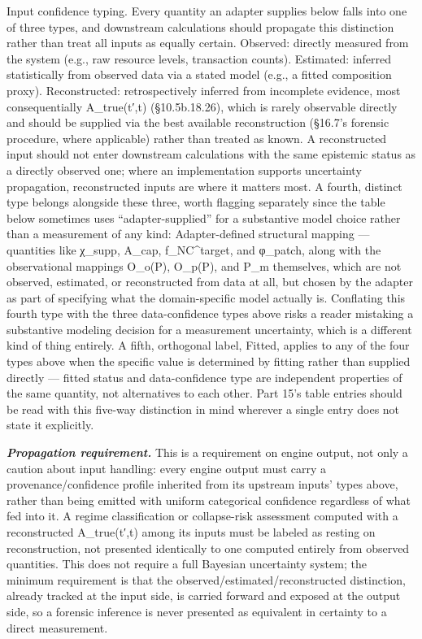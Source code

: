 \documentclass[
]{article}
\begin{document}
Input confidence typing. Every quantity an adapter supplies below falls
into one of three types, and downstream calculations should propagate
this distinction rather than treat all inputs as equally certain.
Observed: directly measured from the system (e.g., raw resource levels,
transaction counts). Estimated: inferred statistically from observed
data via a stated model (e.g., a fitted composition proxy).
Reconstructed: retrospectively inferred from incomplete evidence, most
consequentially A\_true(t′,t) (§10.5b.18.26), which is rarely observable
directly and should be supplied via the best available reconstruction
(§16.7's forensic procedure, where applicable) rather than treated as
known. A reconstructed input should not enter downstream calculations
with the same epistemic status as a directly observed one; where an
implementation supports uncertainty propagation, reconstructed inputs
are where it matters most. A fourth, distinct type belongs alongside
these three, worth flagging separately since the table below sometimes
uses ``adapter-supplied'' for a substantive model choice rather than a
measurement of any kind: Adapter-defined structural mapping ---
quantities like χ\_supp, A\_cap, f\_NC\^{}target, and φ\_patch, along
with the observational mappings O\_o(P), O\_p(P), and P\_m themselves,
which are not observed, estimated, or reconstructed from data at all,
but chosen by the adapter as part of specifying what the domain-specific
model actually is. Conflating this fourth type with the three
data-confidence types above risks a reader mistaking a substantive
modeling decision for a measurement uncertainty, which is a different
kind of thing entirely. A fifth, orthogonal label, Fitted, applies to
any of the four types above when the specific value is determined by
fitting rather than supplied directly --- fitted status and
data-confidence type are independent properties of the same quantity,
not alternatives to each other. Part 15's table entries should be read
with this five-way distinction in mind wherever a single entry does not
state it explicitly.

\emph{\textbf{Propagation requirement.}} This is a requirement on engine
output, not only a caution about input handling: every engine output
must carry a provenance/confidence profile inherited from its upstream
inputs' types above, rather than being emitted with uniform categorical
confidence regardless of what fed into it. A regime classification or
collapse-risk assessment computed with a reconstructed A\_true(t′,t)
among its inputs must be labeled as resting on reconstruction, not
presented identically to one computed entirely from observed quantities.
This does not require a full Bayesian uncertainty system; the minimum
requirement is that the observed/estimated/reconstructed distinction,
already tracked at the input side, is carried forward and exposed at the
output side, so a forensic inference is never presented as equivalent in
certainty to a direct measurement.
\end{document}
